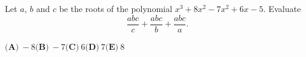 Let $a$, $b$ and $c$ be the roots of the polynomial $x^3+8x^2-7x^2+6x-5$. Evaluate
\[\dfrac{abc}{c}+\dfrac{abc}{b}+\dfrac{abc}{a}.\]

$\textbf{(A)}\ -8$\qquad$\textbf{(B)}\ -7$\qquad$\textbf{(C)}\ 6$\qquad$\textbf{(D)}\ 7$\qquad$\textbf{(E)}\ 8$
